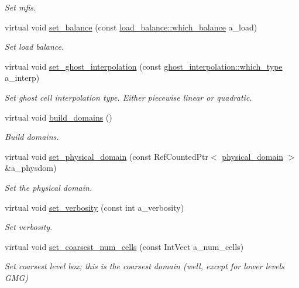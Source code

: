 \begin{DoxyCompactItemize}
\begin{DoxyCompactList}\small\item\em Set mfis. \end{DoxyCompactList}\item 
virtual void \hyperlink{classamr__mesh_ad25700d49767ec02285f35015b6d8901}{set\+\_\+balance} (const \hyperlink{classload__balance_aeda8ae1759629dfa65e6691678d0b3b9}{load\+\_\+balance\+::which\+\_\+balance} a\+\_\+load)
\begin{DoxyCompactList}\small\item\em Set load balance. \end{DoxyCompactList}\item 
virtual void \hyperlink{classamr__mesh_a71f6fcbd0a3dc240c239573859f45484}{set\+\_\+ghost\+\_\+interpolation} (const \hyperlink{namespaceghost__interpolation_a2e226123d3c841dd1034c7e62db3468c}{ghost\+\_\+interpolation\+::which\+\_\+type} a\+\_\+interp)
\begin{DoxyCompactList}\small\item\em Set ghost cell interpolation type. Either piecewise linear or quadratic. \end{DoxyCompactList}\item 
virtual void \hyperlink{classamr__mesh_a4e84f40d9a20225be0244359e5599146}{build\+\_\+domains} ()
\begin{DoxyCompactList}\small\item\em Build domains. \end{DoxyCompactList}\item 
virtual void \hyperlink{classamr__mesh_ac65eddcdaef8f0b4badd5fd1495c5233}{set\+\_\+physical\+\_\+domain} (const Ref\+Counted\+Ptr$<$ \hyperlink{classphysical__domain}{physical\+\_\+domain} $>$ \&a\+\_\+physdom)
\begin{DoxyCompactList}\small\item\em Set the physical domain. \end{DoxyCompactList}\item 
virtual void \hyperlink{classamr__mesh_a1e498f9de760b19eb363604c83c6779f}{set\+\_\+verbosity} (const int a\+\_\+verbosity)
\begin{DoxyCompactList}\small\item\em Set verbosity. \end{DoxyCompactList}\item 
virtual void \hyperlink{classamr__mesh_a816e11b1dc2324c5e6195f58913ff227}{set\+\_\+coarsest\+\_\+num\+\_\+cells} (const Int\+Vect a\+\_\+num\+\_\+cells)
\begin{DoxyCompactList}\small\item\em Set coarsest level box; this is the coarsest domain (well, except for lower levels G\+MG) \end{DoxyCompactList}\item 

\end{DoxyCompactItemize}
